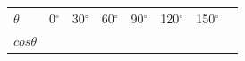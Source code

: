 \begin{center}
\label{m39414*id86399}
\noindent
{}
\tablelasttail{}
\begin{xtabular*}{\mytablewidth}[t]{|p{10\mystarwidth}|p{10\mystarwidth}|p{10\mystarwidth}|p{10\mystarwidth}|p{10\mystarwidth}|p{10\mystarwidth}|p{10\mystarwidth}|p{10\mystarwidth}|}\hline
    $\theta $
    &
0${}^{\circ }$ &
30${}^{\circ }$ &
60${}^{\circ }$ &
90${}^{\circ }$ &
120${}^{\circ }$ &
150${}^{\circ }$ &
\tabularnewline{}
    $cos\theta $
    &
&
&

\end{xtabular*}
\end{center}
